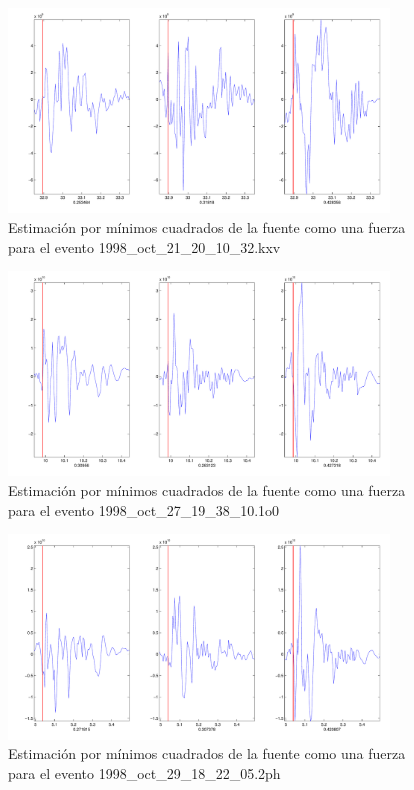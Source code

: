 \begin{figure}[H]
\includegraphics[width=0.9\textwidth,height=0.4\textheight]{linea_timerev/figuras/plotSrcEv22src.pdf}
\caption{Estimación por mínimos cuadrados de la fuente como una fuerza para el
evento 1998\_oct\_21\_20\_10\_32.kxv}
\end{figure}
\begin{figure}[H]
\includegraphics[width=0.9\textwidth,height=0.4\textheight]{linea_timerev/figuras/plotSrcEv23src.pdf}
\caption{Estimación por mínimos cuadrados de la fuente como una fuerza para el
evento 1998\_oct\_27\_19\_38\_10.1o0}
\end{figure}
\begin{figure}[H]
\includegraphics[width=0.9\textwidth,height=0.4\textheight]{linea_timerev/figuras/plotSrcEv24src.pdf}
\caption{Estimación por mínimos cuadrados de la fuente como una fuerza para el
evento 1998\_oct\_29\_18\_22\_05.2ph}
\end{figure}
